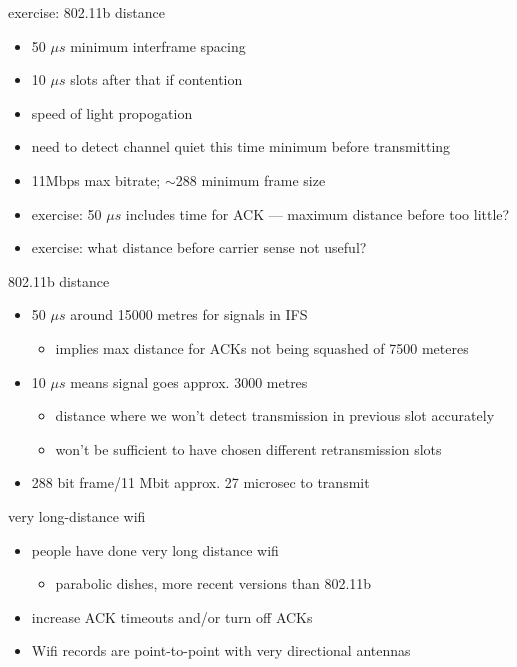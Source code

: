 
\begin{frame}{exercise: 802.11b distance}
    \begin{itemize}
    \item 50 $\mu s$ minimum interframe spacing
    \item 10 $\mu s$ slots after that if contention
    \item speed of light propogation
    \item need to detect channel quiet this time minimum before transmitting
    \item 11Mbps max bitrate; $\sim$288 minimum frame size
    \vspace{.5cm}
    \item exercise: 50 $\mu s$ includes time for ACK --- maximum distance before too little?
    \item exercise: what distance before carrier sense not useful?
    \end{itemize}
\end{frame}

\begin{frame}{802.11b distance}
\begin{itemize}
\item 50 $\mu s$ around 15000 metres for signals in IFS
    \begin{itemize}
    \item implies max distance for ACKs not being squashed of 7500 meteres
    \end{itemize}
\item 10 $\mu s$ means signal goes approx. 3000 metres
    \begin{itemize}
    \item distance where we won't detect transmission in previous slot accurately
    \item won't be sufficient to have chosen different retransmission slots
    \end{itemize}
\item 288 bit frame/11 Mbit approx. 27 microsec to transmit
\end{itemize}
\end{frame}

\begin{frame}{very long-distance wifi}
    \begin{itemize}
    \item people have done very long distance wifi
        \begin{itemize}
        \item parabolic dishes, more recent versions than 802.11b
        \end{itemize}
    \item increase ACK timeouts and/or turn off ACKs
    \vspace{.5cm}
    \item Wifi records are point-to-point with very directional antennas
    \end{itemize}
\end{frame}

